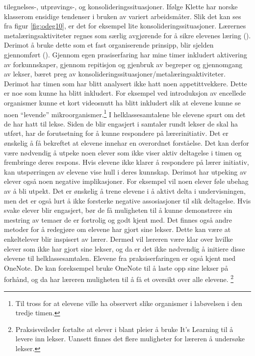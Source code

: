 \documentclass[main.tex]{subfiles}
\begin{document}
tilegnelses-, utprøvings-, og konsolideringssituasjoner. Ifølge Klette har norske klasserom ensidige 
tendenser i bruken av variert arbeidsmåter. Slik det kan ses fra figur \ref{fig:odeg10}, er det for 
eksempel lite konsolideringssituasjoner. Lærernes metalæringsaktiviteter regnes som særlig 
avgjørende for å sikre elevenes læring (). Derimot å bruke dette som et fast
organiserende prinsipp, blir sjelden gjennomført (). Gjennom egen prasiserfaring
har mine timer inkludert aktivering av forkunnskaper, gjennom repitisjon og gjenbruk av begreper 
og gjennomgang av lekser, bæret preg av konsolideringssituasjoner/metalæringsaktiviteter. Derimot
har timen som har blitt analysert ikke hatt noen appetittvekkere. Dette er noe som kunne ha blitt 
inkludert. For eksempel ved introduksjon av encellede organismer kunne et kort videosnutt ha blitt
inkludert slik at elevene kunne se noen ``levende'' mikroorganismer.\footnote[3]{Til tross for at 
elevene ville ha observert slike organismer i labøvelsen i den tredje timen.}  
\newline
\newline
I helklassesamtalene ble elevene spurt om det de har hatt til lekse.
Siden de blir engasjert i samtaler rundt lekser de skal ha utført, har de forutsetning for å kunne 
respondere på lærerinitiativ. Det er ønskelig å få bekreftet at elevene innehar en overordnet 
forståelse. Det kan derfor være nødvendig å utpeke noen elever som ikke viser aktiv deltagelse i 
timen og frembringe deres respons. Hvis elevene ikke klarer å respondere på lærer initiativ, kan 
utspørringen av elevene vise hull i deres kunnskap. Derimot har utpeking av elever også noen 
negative implikasjoner. For eksempel vil noen elever føle ubehag av å bli utpekt. Det er ønskelig å 
trene elevene i å aktivt delta i undervisningen, men det er også lurt å ikke forsterke negative 
assosiasjoner til slik deltagelse. Hvis svake elever blir engasjert, bør de få muligheten til å 
kunne demonstrere sin mestring av temaer de er fortrolig og godt kjent med. Det finnes også andre 
metoder for å redegjøre om elevene har gjort sine lekser. Dette kan være at enkeltelever blir 
inspisert av lærer. Dermed vil læreren være klar over hvilke elever som ikke har gjort sine lekser, 
og da er det ikke nødvendig å initiere disse elevene til helklassesamtalen. Elevene fra 
praksiserfaringen er også kjent med OneNote. De kan foreksempel bruke OneNote til å laste opp 
sine lekser på forhånd, og da har læreren muligheten til å få et oversikt over alle elevene.
\footnote[4]{Praksisveileder fortalte at elever i blant pleier å bruke It's Learning til å levere
inn lekser. Uansett finnes det flere muligheter for læreren å undersøke lekser.}
\end{document}

